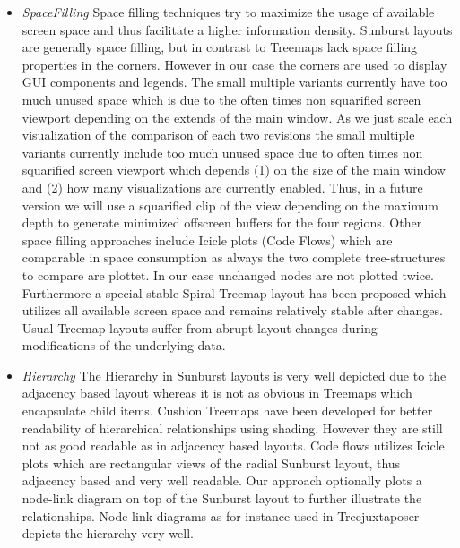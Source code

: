 \begin{itemize}
\item \emph{SpaceFilling} Space filling techniques try to maximize the usage of available screen space and thus facilitate a higher information density. Sunburst layouts are generally space filling, but in contrast to Treemaps lack space filling properties in the corners. However in our case the corners are used to display GUI components and legends. The small multiple variants currently have too much unused space which is due to the often times non squarified screen viewport depending on the extends of the main window. As we just scale each visualization of the comparison of each two revisions the small multiple variants currently include too much unused space due to often times non squarified screen viewport which depends (1) on the size of the main window and (2) how many visualizations are currently enabled. Thus, in a future version we will use a squarified clip of the view depending on the maximum depth to generate minimized offscreen buffers for the four regions. Other space filling approaches include Icicle plots (Code Flows) which are comparable in space consumption as always the two complete tree-structures to compare are plottet. In our case unchanged nodes are not plotted twice. Furthermore a special stable Spiral-Treemap layout has been proposed which utilizes all available screen space and remains relatively stable after changes. Usual Treemap layouts suffer from abrupt layout changes during modifications of the underlying data.
\item \emph{Hierarchy} The Hierarchy in Sunburst layouts is very well depicted due to the adjacency based layout whereas it is not as obvious in Treemaps which encapsulate child items. Cushion Treemaps have been developed for better readability of hierarchical relationships using shading. However they are still not as good readable as in adjacency based layouts. Code flows utilizes Icicle plots which are rectangular views of the radial Sunburst layout, thus adjacency based and very well readable. Our approach optionally plots a node-link diagram on top of the Sunburst layout to further illustrate the relationships. Node-link diagrams as for instance used in Treejuxtaposer depicts the hierarchy very well. 

\end{itemize}

